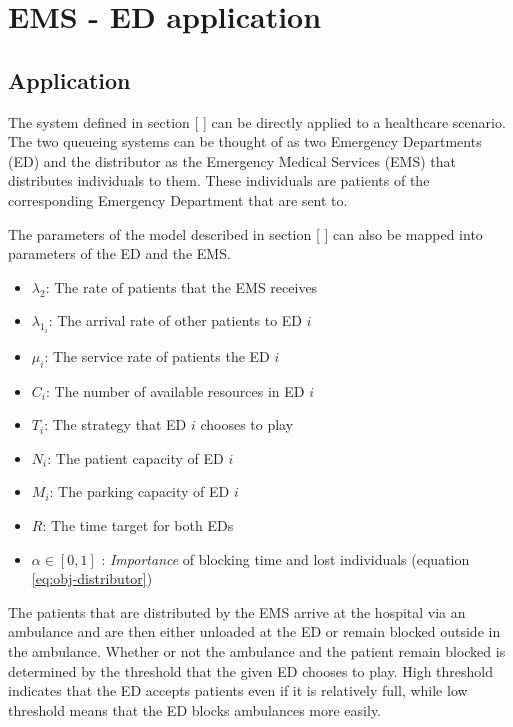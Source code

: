 \section{EMS - ED application}

\subsection{Application}

The system defined in section [ ] 
can be directly applied to a healthcare scenario.
The two queueing systems can be thought of as two Emergency Departments (ED) and 
the distributor as the Emergency Medical Services (EMS) that distributes 
individuals to them.
These individuals are patients of the corresponding Emergency Department 
that are sent to.

The parameters of the model described in section [ ]
can also be mapped into parameters of the ED and the EMS.

\begin{itemize}
    \item \( \lambda_2 \): The rate of patients that the EMS receives
    \item \( \lambda_{1_i} \): The arrival rate of other patients to ED \(i\)
    \item \( \mu_i \): The service rate of patients the ED \(i\)
    \item \( C_i \): The number of available resources in ED \(i\)  
    \item \( T_i \): The strategy that ED \(i\) chooses to play
    \item \( N_i \): The patient capacity of ED \(i\)
    \item \( M_i \): The parking capacity of ED \(i\)
    \item \( R \): The time target for both EDs
    \item \( \alpha \in [0, 1] \) : \textit{Importance} of blocking time and lost 
    individuals (equation \ref{eq:obj-distributor})
\end{itemize}

The patients that are distributed by the EMS arrive at the hospital via an 
ambulance and are then either unloaded at the ED or remain blocked outside in 
the ambulance.
Whether or not the ambulance and the patient remain blocked is determined by 
the threshold that the given ED chooses to play.
High threshold indicates that the ED accepts patients even if it is relatively 
full, while low threshold means that the ED blocks ambulances more easily.

